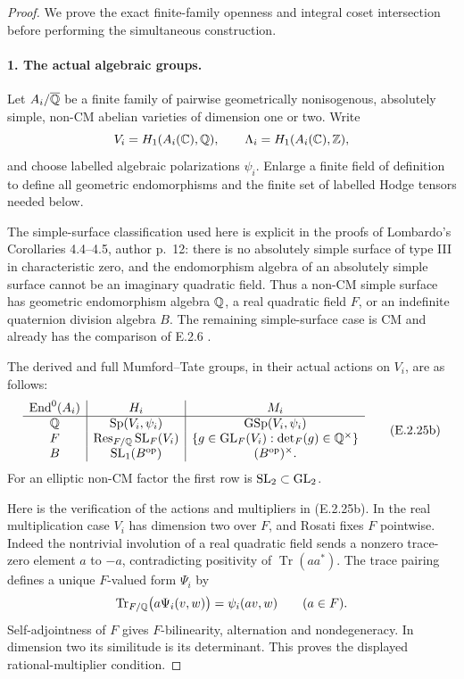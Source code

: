 \begin{proof}
We prove the exact finite-family openness and integral
coset intersection before performing the simultaneous
construction.

\paragraph{1. The actual algebraic groups.}
Let \(A_i/\overline{\mathbb Q}\) be a finite family of pairwise
geometrically nonisogenous, absolutely simple, non-CM
abelian varieties of dimension one or two. Write
\[
 V_i=H_1(A_i(\mathbb C),\mathbb Q),\qquad
 \Lambda_i=H_1(A_i(\mathbb C),\mathbb Z),
\]
and choose labelled algebraic polarizations \(\psi_i\).
Enlarge a finite field of definition to define all
geometric endomorphisms and the finite set of labelled
Hodge tensors needed below.

The simple-surface classification used here is explicit
in the proofs of Lombardo's Corollaries 4.4--4.5,
author p.~12: there is no absolutely simple surface of
type III in characteristic zero, and the endomorphism
algebra of an absolutely simple surface cannot be an
imaginary quadratic field. Thus a non-CM simple surface
has geometric endomorphism algebra \(\mathbb Q\), a real
quadratic field \(F\), or an indefinite quaternion
division algebra \(B\). The remaining simple-surface
case is CM and already has the comparison of E.2.6
\cite[Corollaries 4.4--4.5 and their proofs, p.~12]
{GenLombardoNonsimple2015}.

The derived and full Mumford--Tate groups, in their
actual actions on \(V_i\), are as follows:
\[
\begin{array}{c|c|c}
 \operatorname{End}^0(A_i)&H_i&M_i\\ \hline
 \mathbb Q&\operatorname{Sp}(V_i,\psi_i)
       &\operatorname{GSp}(V_i,\psi_i)\\
 F&\operatorname{Res}_{F/\mathbb Q}\operatorname{SL}_{F}(V_i)
       &\{g\in\operatorname{GL}_F(V_i):\det_F(g)\in\mathbb Q^\times\}\\
 B&\operatorname{SL}_1(B^{\mathrm{op}})
       &(B^{\mathrm{op}})^\times .
\end{array}
\tag{E.2.25b}
\]
For an elliptic non-CM factor the first row is
\(\operatorname{SL}_2\subset\operatorname{GL}_2\).

Here is the verification of the actions and multipliers
in (E.2.25b). In the real multiplication case \(V_i\)
has dimension two over \(F\), and Rosati fixes \(F\)
pointwise. Indeed the nontrivial involution of a real
quadratic field sends a nonzero trace-zero element
\(a\) to \(-a\), contradicting positivity of
\(\operatorname{Tr}(aa^*)\). The trace pairing defines
a unique \(F\)-valued form \(\Psi_i\) by
\[
 \operatorname{Tr}_{F/\mathbb Q}\bigl(a\Psi_i(v,w)\bigr)
                  =\psi_i(av,w)\qquad(a\in F).
\]
Self-adjointness of \(F\) gives \(F\)-bilinearity,
alternation and nondegeneracy. In dimension two its
similitude is its determinant. This proves the displayed
rational-multiplier condition.


\end{proof}
